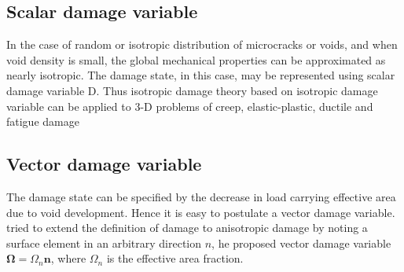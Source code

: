 \documentclass[12pt,a4paper,twoside,openright]{report}
\begin{document}
\subsection{Scalar damage variable}
\indent\indent\indent In the case of random or isotropic distribution of microcracks or voids, and when void density is small, the global mechanical properties can be approximated as nearly isotropic. The damage state, in this case, may be represented using scalar damage variable D. Thus isotropic damage theory based on isotropic damage variable can be applied to 3-D problems of creep, elastic-plastic, ductile and fatigue damage \citep{lemaitre2012course}
\subsection{Vector damage variable}
\indent\indent\indent The damage state can be specified by the decrease in load carrying effective area due to void development. Hence it is easy to postulate a vector damage variable.  \citep{kachanov1986introduction} tried to extend the definition of damage to anisotropic damage by noting a surface element in an arbitrary direction $n$, he proposed vector damage variable $ \mathbf{\Omega} = \Omega_{n} \mathbf{n} $, where $\Omega_{n}$ is the effective area fraction. 
\end{document}
